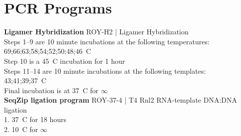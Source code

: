 \section{PCR Programs}\label{AppendixMisc:sec:PCR Programs}

\textbf{Ligamer Hybridization}
ROY-H2 | Ligamer Hybridization\\
  Steps 1–9 are 10 minute incubations at the following temperatures:\\
  69;66;63;58;54;52;50;48;46\degree~C\\
  Step 10 is a 45\degree~C incubation for 1 hour\\
  Steps 11–14 are 10 minute incubations at the following templates:\\
  43;41;39;37\degree~C\\
  Final incubation is at 37\degree~C for $\infty$\\

\textbf{SeqZip ligation program}
ROY-37-4 | T4 Rnl2 RNA-template DNA:DNA ligation\\
  1. 37\degree~C for 18 hours\\
  2. 10\degree~C for $\infty$ \\

